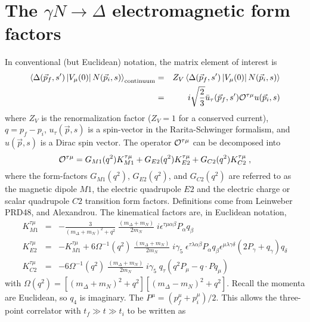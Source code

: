 \documentclass[12pt]{article}
\begin{document}
\newpage

\section{The $\gamma N\rightarrow \Delta$ electromagnetic form factors}

In conventional (but Euclidean) notation, the matrix element of interest is
\begin{eqnarray}
\left<\Delta(\vec{p}_f,s^\prime)\left|V_\mu(0)\right|N(\vec{p}_i,s)
     \right>_{\rm continuum}
&=& Z_V\left<\Delta(\vec{p}_f,s^\prime)\left|V_\mu(0)\right|N(\vec{p}_i,s)
    \right> \nonumber \\
&=& i\sqrt{\frac{2}{3}}
     \bar{u}_\tau(\vec{p}_f,s^\prime){\cal O}^{\tau\mu}u(\vec{p}_i,s)
\end{eqnarray}
where $Z_V$ is the renormalization factor ($Z_V=1$ for a conserved current),
$q=p_f-p_i$, $u_\tau(\vec{p},s)$ is a spin-vector in the Rarita-Schwinger formalism, 
and $u(\vec{p},s)$ is a Dirac spin vector. The operator ${\cal O}^{\tau\mu}$ can be 
decomposed into
\[
{\cal O}^{\tau \mu} =
  G_{M1}(q^2) K^{\tau \mu}_{M1} 
 +G_{E2}(q^2) K^{\tau \mu}_{E2} 
 +G_{C2}(q^2) K^{\tau \mu}_{C2} \;,
\]
where the form-factors $G_{M1}(q^2)$, $G_{E2}(q^2)$, and $G_{C2}(q^2)$ are 
referred to as the magnetic dipole $M1$, the electric quadrupole $E2$ and 
the electric charge or scalar quadrupole $C2$ transition form factors. 
Definitions come from Leinweber PRD48, and Alexandrou. The
kinematical factors are, in Euclidean notation,
\begin{eqnarray}
 K^{\tau \mu}_{M1} & = & -\frac{3}{(m_\Delta+m_N)^2+q^2 } \; 
\frac{(m_\Delta+m_N)}{2 m_N}\;
i\epsilon^{\tau \mu \alpha \beta} P_\alpha q_\beta \\
  K^{\tau \mu}_{E2} & = & -  K^{\tau \mu}_{M1} + 6\Omega^{-1}(q^2)\; 
\frac{(m_\Delta+m_N)}{2 m_N} \;
i\gamma_5 \;\epsilon^{\tau \lambda \alpha \beta} P_\alpha q_\beta 
\epsilon^{\mu \lambda \gamma \delta} (2P_{\gamma}+q_\gamma)q_\delta \\
K^{\tau \mu}_{C2} & = &-6\Omega^{-1}(q^2)\; \frac{(m_\Delta+m_N)}{2 m_N} \;
i\gamma_5 \; q_{\tau} \left(q^2 P_{\mu} - q\cdot P q_{\mu}\right)
\end{eqnarray}
with $\Omega(q^2) = \left[(m_\Delta+m_N)^2+q^2\right]\left
[(m_\Delta-m_N)^2+q^2\right]$. Recall the momenta are Euclidean, so 
$q_4$ is imaginary.
The $P^\mu = (p_f^\mu + p_i^\mu)/2$.
This allows the three-point correlator with $t_f\gg t\gg t_i$ to be written as
\end{document}
